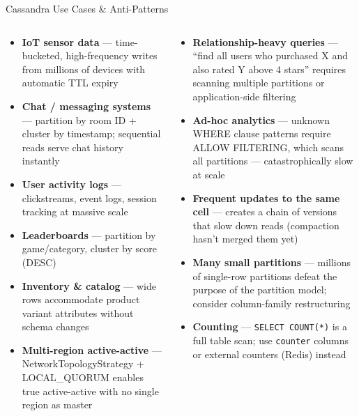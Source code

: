 \documentclass[aspectratio=169]{beamer}
\begin{document}
\begin{frame}{Cassandra Use Cases \& Anti-Patterns}
  \begin{columns}[T]
      \begin{tcolorbox}[cassbox, title={[OK] Ideal Use Cases}]
        \small
        \begin{itemize}
          \item \textbf{IoT sensor data} — time-bucketed, high-frequency writes from millions of devices with automatic TTL expiry
          \item \textbf{Chat / messaging systems} — partition by room ID + cluster by timestamp; sequential reads serve chat history instantly
          \item \textbf{User activity logs} — clickstreams, event logs, session tracking at massive scale
          \item \textbf{Leaderboards} — partition by game/category, cluster by score (DESC)
          \item \textbf{Inventory \& catalog} — wide rows accommodate product variant attributes without schema changes
          \item \textbf{Multi-region active-active} — NetworkTopologyStrategy + LOCAL\_QUORUM enables true active-active with no single region as master
        \end{itemize}
      \end{tcolorbox}
      \begin{tcolorbox}[deepdivebox, title={[!] Anti-Patterns}]
        \small
        \begin{itemize}
          \item \textbf{Relationship-heavy queries} — ``find all users who purchased X and also rated Y above 4 stars'' requires scanning multiple partitions or application-side filtering
          \item \textbf{Ad-hoc analytics} — unknown WHERE clause patterns require ALLOW FILTERING, which scans all partitions — catastrophically slow at scale
          \item \textbf{Frequent updates to the same cell} — creates a chain of versions that slow down reads (compaction hasn't merged them yet)
          \item \textbf{Many small partitions} — millions of single-row partitions defeat the purpose of the partition model; consider column-family restructuring
          \item \textbf{Counting} — \texttt{SELECT COUNT(*)} is a full table scan; use \texttt{counter} columns or external counters (Redis) instead
        \end{itemize}
      \end{tcolorbox}
  \end{columns}
\end{frame}
\end{document}
